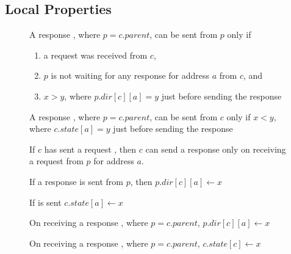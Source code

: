 \subsection{Local Properties}
\label{sec:localProperties}


\begin{figure}\small
\begin{inv}
A response , where $p = c.parent$, can be sent from $p$ only
if
\begin{enumerate}
\item a request  was received from $c$,
\item $p$ is not waiting for any response for address $a$ from $c$, and
\item $x > y$, where $p.dir[c][a] = y$ just before sending the response
\end{enumerate}
\label{pSendRespPre}
\end{inv}
\begin{inv}
A response , where $p = c.parent$, can be sent from $c$ only
if $x < y$, where $c.state[a] = y$ just before sending the
response\label{cSendRespPre1}
\end{inv}
\begin{inv}
If $c$ has sent a request , then $c$ can send a response
 only on receiving a request from $p$ for address $a$.
\label{cSendRespPre2}
\end{inv}
%
\begin{inv}
If a response  is sent from $p$, then $p.dir[c][a] \gets x$\label{cSendRespPost}
\end{inv}
\begin{inv}
If  is sent $c.state[a] \gets x$\label{pSendRespPost}
\end{inv}
\begin{inv}
On receiving a response , where $p = c.parent$, $p.dir[c][a]
\gets x$\label{pRecvResp}
\end{inv}
\begin{inv}
On receiving a response , where $p = c.parent$, $c.state[c]
\gets x$\label{cRecvResp}
\end{inv}
\begin{inv}

\end{inv}
\end{figure}
